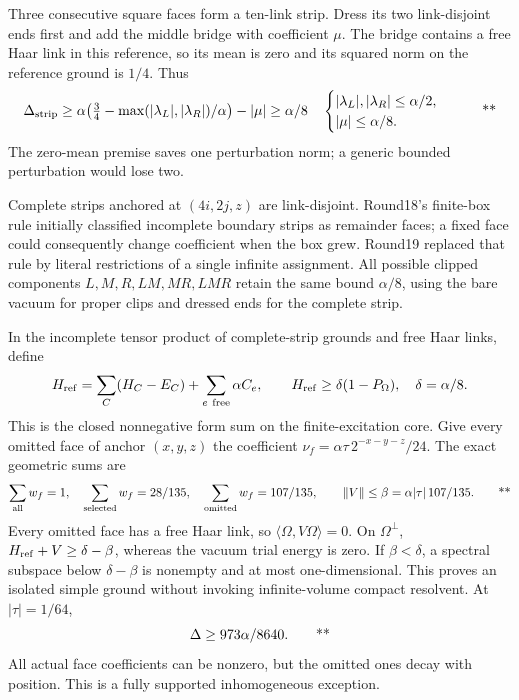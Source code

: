 Three consecutive square faces form a ten-link strip. Dress its two
link-disjoint ends first and add the middle bridge with coefficient \(\mu\).
The bridge contains a free Haar link in this reference, so its mean is
zero and its squared norm on the reference ground is \(1/4\).
Thus
\[
 \Delta_{\rm strip}\ge
 \alpha\!\left(\tfrac34-
 \max(|\lambda_L|,|\lambda_R|)/\alpha\right)-|\mu|
 \ge\alpha/8
 \quad
 \begin{cases}
 |\lambda_L|,|\lambda_R|\le\alpha/2,\\
 |\mu|\le\alpha/8 .
 \end{cases}
 \qquad\text{**}
\]
The zero-mean premise saves one perturbation norm; a generic bounded
perturbation would lose two.

Complete strips anchored at \((4i,2j,z)\) are link-disjoint. Round18's
finite-box rule initially classified incomplete boundary strips as
remainder faces; a fixed face could consequently change coefficient when
the box grew. Round19 replaced that rule by literal restrictions of a
single infinite assignment. All possible clipped components
\(L,M,R,LM,MR,LMR\) retain the same bound \(\alpha/8\), using the bare
vacuum for proper clips and dressed ends for the complete strip.

In the incomplete tensor product of complete-strip grounds and free Haar
links, define
\[
 H_{\rm ref}=\sum_C(H_C-E_C)+\sum_{e\ {\rm free}}\alpha C_e,
 \qquad H_{\rm ref}\ge\delta(1-P_\Omega),\quad\delta=\alpha/8.
\]
This is the closed nonnegative form sum on the finite-excitation core.
Give every omitted face of anchor \((x,y,z)\) the coefficient
\(\nu_f=\alpha\tau\,2^{-x-y-z}/24\).
The exact geometric sums are
\begin{equation}
 \sum_{\rm all}w_f=1,\quad
 \sum_{\rm selected}w_f=28/135,\quad
 \sum_{\rm omitted}w_f=107/135,
 \qquad
 \left\lVert V\right\rVert\le\beta=\alpha|\tau|\,107/135.
 \qquad\text{**}
 \label{eq:middle-dyadic}
\end{equation}
Every omitted face has a free Haar link, so
\(\langle\Omega,V\Omega\rangle=0\).
On \(\Omega^\perp\), \(H_{\rm ref}+V\ge\delta-\beta\), whereas the
vacuum trial energy is zero. If \(\beta<\delta\), a spectral subspace
below \(\delta-\beta\) is nonempty and at most one-dimensional. This
proves an isolated simple ground without invoking infinite-volume compact
resolvent. At \(|\tau|=1/64\),
\begin{equation}
 \Delta\ge973\alpha/8640.
 \qquad\text{**}
 \label{eq:middle-summable-gap}
\end{equation}
All actual face coefficients can be nonzero, but the omitted ones decay
with position. This is a fully supported inhomogeneous exception.

